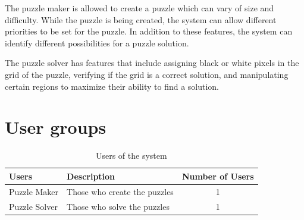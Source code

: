 \documentclass[12pt]{article}
\begin{document}
The puzzle maker is allowed to create a puzzle which can vary of size and difficulty. While the puzzle is being created, the system can allow different priorities to be set for the puzzle. In addition to these features, the system can identify different possibilities for a puzzle solution. 

The puzzle solver has features that include assigning black or white pixels in the grid of the puzzle, verifying if the grid is a correct solution, and manipulating certain regions to maximize their ability to find a solution.

\section{User groups}
\begin{table}[htbp]
\caption{Users of the system}
\begin{center}
\begin{tabular}{|l | l| c|}
\hline
\textbf{Users} & \textbf{Description} & \textbf{Number of Users}\\
\hline\hline
Puzzle Maker & Those who create the puzzles & 1 \\
\hline
Puzzle Solver & Those who solve the puzzles & 1 \\
\hline
\end{tabular}
\end{center}
\end{table}

\clearpage
\end{document}
